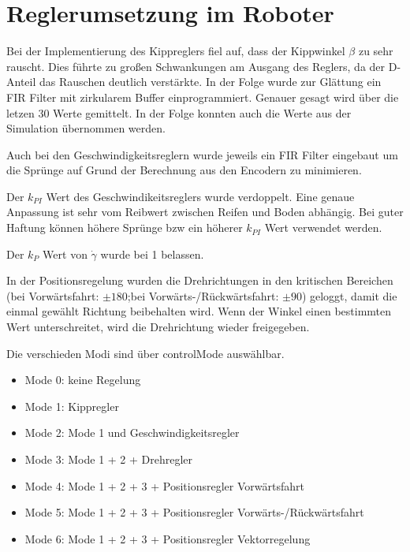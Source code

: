 \renewcommand{\autoren}{Timo Veit, Aleksandar Stoiljkovic}
\newpage
\section{Reglerumsetzung im Roboter}
Bei der Implementierung des Kippreglers fiel auf, dass der Kippwinkel $\beta$ zu sehr rauscht. Dies führte zu großen Schwankungen am Ausgang des Reglers, da der D-Anteil das Rauschen deutlich verstärkte. In der Folge wurde zur Glättung ein FIR Filter mit zirkularem Buffer einprogrammiert. Genauer gesagt wird über die letzen 30 Werte gemittelt.
In der Folge konnten auch die Werte aus der Simulation übernommen werden.

Auch bei den Geschwindigkeitsreglern wurde jeweils ein FIR Filter eingebaut um die Sprünge auf Grund der Berechnung aus den Encodern zu minimieren.

Der $k_{PI}$ Wert des Geschwindikeitsreglers wurde verdoppelt. Eine genaue Anpassung ist sehr vom Reibwert zwischen Reifen und Boden abhängig. Bei guter Haftung können höhere Sprünge bzw ein höherer $k_{PI}$ Wert verwendet werden.

Der $k_{P}$ Wert von $\dot \gamma$ wurde bei 1 belassen.

In der Positionsregelung wurden die Drehrichtungen in den kritischen Bereichen (bei Vorwärtsfahrt: $\pm180$;bei Vorwärts-/Rückwärtsfahrt: $\pm90$) geloggt, damit die einmal gewählt Richtung beibehalten wird. Wenn der Winkel einen bestimmten Wert unterschreitet, wird die Drehrichtung wieder freigegeben.

Die verschieden Modi sind über controlMode auswählbar.

\begin{itemize}
	\item Mode 0: keine Regelung
	\item Mode 1: Kippregler
	\item Mode 2: Mode 1 und Geschwindigkeitsregler
	\item Mode 3: Mode 1 + 2 + Drehregler
	\item Mode 4: Mode 1 + 2 + 3 + Positionsregler Vorwärtsfahrt
	\item Mode 5: Mode 1 + 2 + 3 + Positionsregler Vorwärts-/Rückwärtsfahrt
	\item Mode 6: Mode 1 + 2 + 3 + Positionsregler Vektorregelung
\end{itemize}

\newpage
